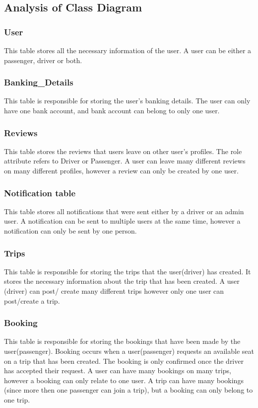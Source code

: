 \documentclass[hidelinks, 12pt, a4paper]{article}
\begin{document}
\subsection{Analysis of Class Diagram}

\subsubsection{User}
This table stores all the necessary information of the user. A user can be either a passenger, driver or both.

\subsubsection{Banking\_Details}
This table is responsible for storing the user’s banking details. The user can only have one bank account, and bank account can belong to only one user.

\subsubsection{Reviews}
This table stores the reviews that users leave on other user’s profiles. The role attribute refers to Driver or Passenger. A user can leave many different reviews on many different profiles, however a review can only be created by one user.


\subsubsection{Notification table}
This table stores all notifications that were sent either by a driver or an admin user. A notification can be sent to multiple users at the same time, however a notification can only be sent by one person.


\subsubsection{Trips}
This table is responsible for storing the trips that the user(driver) has created. It stores the necessary information about the trip that has been created. A user (driver) can post/ create many different trips however only one user can post/create a trip.


\subsubsection{Booking}
This table is responsible for storing the bookings that have been made by the user(passenger). Booking occurs when a user(passenger) requests an available seat on a trip that has been created. The booking is only confirmed once the driver has accepted their request. A user can have many bookings on many trips, however a booking can only relate to one user. A trip can have many bookings (since more then one passenger can join a trip), but a booking can only belong to one trip.
\end{document}
